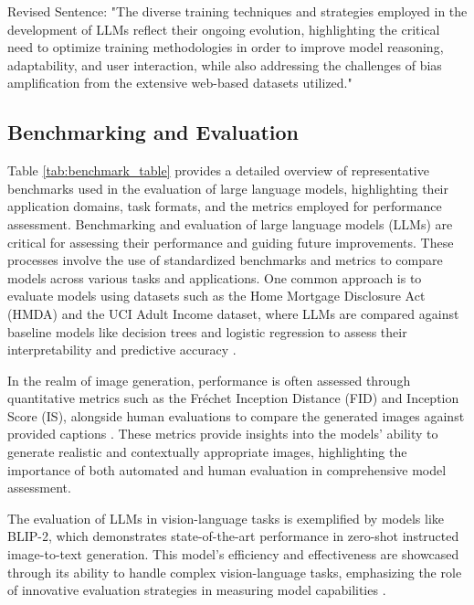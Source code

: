 Revised Sentence: "The diverse training techniques and strategies employed in the development of LLMs reflect their ongoing evolution, highlighting the critical need to optimize training methodologies in order to improve model reasoning, adaptability, and user interaction, while also addressing the challenges of bias amplification from the extensive web-based datasets utilized." \cite{kojima2022large}




\subsection{Benchmarking and Evaluation} \label{subsec:Benchmarking and Evaluation}



Table \ref{tab:benchmark_table} provides a detailed overview of representative benchmarks used in the evaluation of large language models, highlighting their application domains, task formats, and the metrics employed for performance assessment. Benchmarking and evaluation of large language models (LLMs) are critical for assessing their performance and guiding future improvements. These processes involve the use of standardized benchmarks and metrics to compare models across various tasks and applications. One common approach is to evaluate models using datasets such as the Home Mortgage Disclosure Act (HMDA) and the UCI Adult Income dataset, where LLMs are compared against baseline models like decision trees and logistic regression to assess their interpretability and predictive accuracy \cite{wei2022safetyinterpretablemachinelearning}. 

In the realm of image generation, performance is often assessed through quantitative metrics such as the Fréchet Inception Distance (FID) and Inception Score (IS), alongside human evaluations to compare the generated images against provided captions \cite{ramesh2021zero}. These metrics provide insights into the models' ability to generate realistic and contextually appropriate images, highlighting the importance of both automated and human evaluation in comprehensive model assessment.

The evaluation of LLMs in vision-language tasks is exemplified by models like BLIP-2, which demonstrates state-of-the-art performance in zero-shot instructed image-to-text generation. This model's efficiency and effectiveness are showcased through its ability to handle complex vision-language tasks, emphasizing the role of innovative evaluation strategies in measuring model capabilities \cite{li2023blip}.

